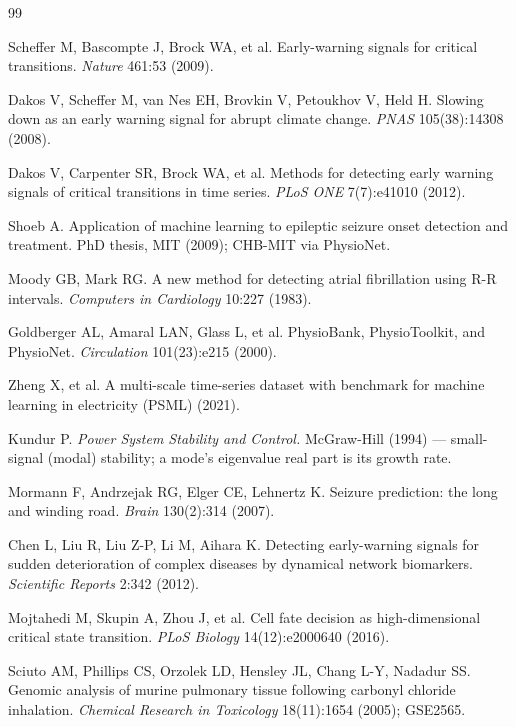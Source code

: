 \documentclass[11pt]{article}
\begin{document}
\begin{thebibliography}{99}

 Scheffer M, Bascompte J, Brock WA, et al.
Early-warning signals for critical transitions. \emph{Nature} 461:53
(2009).

 Dakos V, Scheffer M, van Nes EH, Brovkin V,
Petoukhov V, Held H. Slowing down as an early warning signal for abrupt
climate change. \emph{PNAS} 105(38):14308 (2008).

 Dakos V, Carpenter SR, Brock WA, et al. Methods for
detecting early warning signals of critical transitions in time series.
\emph{PLoS ONE} 7(7):e41010 (2012).

 Shoeb A. Application of machine learning to
epileptic seizure onset detection and treatment. PhD thesis, MIT (2009);
CHB-MIT via PhysioNet.

 Moody GB, Mark RG. A new method for detecting atrial
fibrillation using R-R intervals. \emph{Computers in Cardiology} 10:227
(1983).

 Goldberger AL, Amaral LAN, Glass L, et al.
PhysioBank, PhysioToolkit, and PhysioNet. \emph{Circulation}
101(23):e215 (2000).

 Zheng X, et al. A multi-scale time-series dataset
with benchmark for machine learning in electricity (PSML) (2021).

 Kundur P. \emph{Power System Stability and
Control.} McGraw-Hill (1994) --- small-signal (modal) stability; a
mode's eigenvalue real part is its growth rate.

 Mormann F, Andrzejak RG, Elger CE, Lehnertz K.
Seizure prediction: the long and winding road. \emph{Brain} 130(2):314
(2007).

 Chen L, Liu R, Liu Z-P, Li M, Aihara K. Detecting
early-warning signals for sudden deterioration of complex diseases by
dynamical network biomarkers. \emph{Scientific Reports} 2:342 (2012).

 Mojtahedi M, Skupin A, Zhou J, et al. Cell fate
decision as high-dimensional critical state transition. \emph{PLoS
Biology} 14(12):e2000640 (2016).

 Sciuto AM, Phillips CS, Orzolek LD, Hensley JL,
Chang L-Y, Nadadur SS. Genomic analysis of murine pulmonary tissue
following carbonyl chloride inhalation. \emph{Chemical Research in
Toxicology} 18(11):1654 (2005); GSE2565.


\end{thebibliography}
\end{document}

